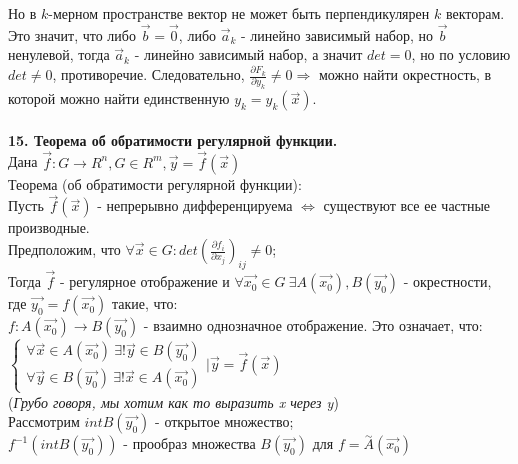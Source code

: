 \documentclass[12pt]{article}
\begin{document}
Но в $k$-мерном пространстве вектор не может быть перпендикулярен $k$ векторам.\\
Это значит, что либо $\overrightarrow{b} = \overrightarrow{0}$, либо $\overrightarrow{a}_k$ - линейно зависимый набор, но $\overrightarrow{b}$ ненулевой, тогда  $\overrightarrow{a}_k$ - линейно зависимый набор, а значит $det = 0$, но по условию $det \neq 0$, противоречие. Следовательно, $\frac{\partial F_k}{\partial y_k} \neq 0 \Rightarrow$ можно найти окрестность, в которой можно найти единственную $y_k = y_k(\overrightarrow{x})$.\\
\\
\label{question15}\textbf{15. Теорема об обратимости регулярной функции.}\\
Дана $\overrightarrow{f} : G \to R^n, G\in R^m, \overrightarrow{y} = \overrightarrow{f}(\overrightarrow{x})$\\
Теорема (об обратимости регулярной функции):\\
Пусть $\overrightarrow{f}(\overrightarrow{x})$ - непрерывно дифференцируема $\iff$ существуют все ее частные производные.\\
Предположим, что $\forall \overrightarrow{x} \in G : det(\frac{\partial f_i}{\partial x_j})_{ij} \neq 0$;\\
Тогда $\overrightarrow{f}$ - регулярное отображение и $\forall \overrightarrow{x_0} \in G \ \exists A(\overrightarrow{x_0}), B(\overrightarrow{y_0})$ - окрестности, где $\overrightarrow{y_0} = f(\overrightarrow{x_0})$ такие, что:\\
$f: A(\overrightarrow{x_0}) \to B(\overrightarrow{y_0})$ - взаимно однозначное отображение. Это означает, что:\\
$\begin{cases}\forall \overrightarrow{x}\in A(\overrightarrow{x_0}) \ \exists! \overrightarrow{y} \in B(\overrightarrow{y_0}) \\ \forall \overrightarrow{y}\in B(\overrightarrow{y_0}) \ \exists! \overrightarrow{x} \in A(\overrightarrow{x_0})\end{cases} | \overrightarrow{y} = \overrightarrow{f}(\overrightarrow{x})$\\
(\emph{Грубо говоря, мы хотим как то выразить x через y})\\
Рассмотрим $int B(\overrightarrow{y_0})$ - открытое множество;\\
$f^{-1}(int B(\overrightarrow{y_0}))$ - прообраз множества $B(\overrightarrow{y_0})$ для $f = \overset{\sim}{A}(\overrightarrow{x_0})$\\
\end{document}
